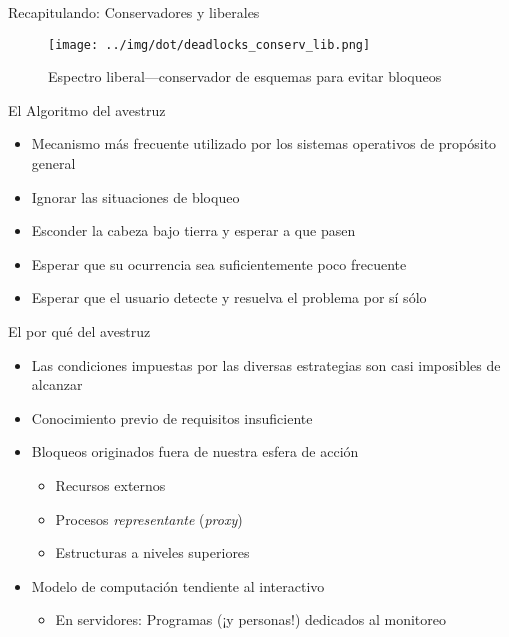 \documentclass[presentation]{beamer}
\begin{document}
\begin{frame}[label={sec:org9c1c88e}]{Recapitulando: Conservadores y liberales}
\begin{figure}[htbp]
\centering
\texttt{[image: ../img/dot/deadlocks\_conserv\_lib.png]}
\caption{Espectro liberal—conservador de esquemas para evitar bloqueos}
\end{figure}
\end{frame}

\begin{frame}[label={sec:org3830e1d}]{El Algoritmo del avestruz}
\begin{itemize}
\item Mecanismo más frecuente utilizado por los sistemas operativos de
propósito general
\item Ignorar las situaciones de bloqueo
\item Esconder la cabeza bajo tierra y esperar a que pasen
\item Esperar que su ocurrencia sea suficientemente poco frecuente
\item Esperar que el usuario detecte y resuelva el problema por sí sólo
\end{itemize}
\end{frame}

\begin{frame}[label={sec:orgcea24c5}]{El por qué del avestruz}
\begin{itemize}
\item Las condiciones impuestas por las diversas estrategias son casi
imposibles de alcanzar
\item Conocimiento previo de requisitos insuficiente
\item Bloqueos originados fuera de nuestra esfera de acción
\begin{itemize}
\item Recursos externos
\item Procesos \emph{representante} (\emph{proxy})
\item Estructuras a niveles superiores
\end{itemize}
\item Modelo de computación tendiente al interactivo
\begin{itemize}
\item En servidores: Programas (¡y personas!) dedicados al monitoreo
\end{itemize}
\end{itemize}
\end{frame}
\end{document}
